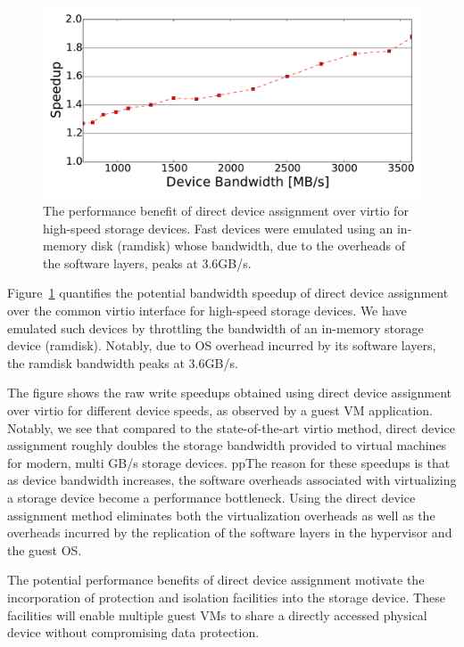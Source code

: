 
\begin{figure}[t]
  \centering
  \includegraphics[width=\columnwidth]{figs/motivation.pdf}
  \caption{The performance benefit of direct device assignment over virtio for high-speed storage devices. Fast devices were emulated using an in-memory disk (ramdisk) whose bandwidth, due to the overheads of the software layers, peaks at 3.6GB/s.
    \label{fig:directperf}}
  \end{figure}

Figure~\ref{fig:directperf} quantifies the potential bandwidth speedup of direct device assignment over the common virtio interface for high-speed storage devices. We have emulated such devices by throttling the bandwidth of an in-memory storage device (ramdisk). Notably, due to OS overhead incurred by its software layers, the ramdisk bandwidth peaks at 3.6GB/s. 

The figure shows the raw write speedups obtained using direct device assignment over virtio for different device speeds, as observed by a guest VM application.
Notably, we see that compared to the state-of-the-art virtio method, direct device assignment roughly doubles the storage bandwidth provided to virtual machines for modern, multi GB/s storage devices.
ppThe reason for these speedups is that as device bandwidth increases, the software overheads associated with virtualizing a storage device become a performance bottleneck.
Using the direct device assignment method eliminates both the virtualization overheads as well as the overheads incurred by the replication of the software layers in the hypervisor and the guest OS.

The potential performance benefits of direct device assignment motivate the incorporation of protection and isolation facilities into the storage device. These facilities will enable multiple guest VMs to share a directly accessed physical device without compromising data protection.

